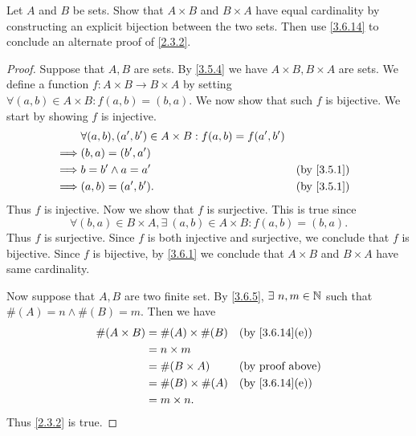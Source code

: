 \begin{ex}\label{ex:3.6.5}
  Let \(A\) and \(B\) be sets.
  Show that \(A \times B\) and \(B \times A\) have equal cardinality by constructing an explicit bijection between the two sets.
  Then use \cref{3.6.14} to conclude an alternate proof of \cref{2.3.2}.
\end{ex}

\begin{proof}
  Suppose that \(A, B\) are sets.
  By \cref{3.5.4} we have \(A \times B, B \times A\) are sets.
  We define a function \(f : A \times B \to B \times A\) by setting \(\forall (a, b) \in A \times B : f(a, b) = (b, a)\).
  We now show that such \(f\) is bijective.
  We start by showing \(f\) is injective.
  \begin{align*}
             & \forall (a, b), (a', b') \in A \times B : f(a, b) = f(a', b')                               \\
    \implies & (b, a) = (b', a')                                                                           \\
    \implies & b = b' \land a = a'                                           &  & \text{(by \cref{3.5.1})} \\
    \implies & (a, b) = (a', b').                                            &  & \text{(by \cref{3.5.1})}
  \end{align*}
  Thus \(f\) is injective.
  Now we show that \(f\) is surjective.
  This is true since
  \[
    \forall (b, a) \in B \times A, \exists\ (a, b) \in A \times B : f(a, b) = (b, a).
  \]
  Thus \(f\) is surjective.
  Since \(f\) is both injective and surjective, we conclude that \(f\) is bijective.
  Since \(f\) is bijective, by \cref{3.6.1} we conclude that \(A \times B\) and \(B \times A\) have same cardinality.

  Now suppose that \(A, B\) are two finite set.
  By \cref{3.6.5}, \(\exists\ n, m \in \N\) such that \(\#(A) = n \land \#(B) = m\).
  Then we have
  \begin{align*}
    \#(A \times B) & = \#(A) \times \#(B) &  & \text{(by \cref{3.6.14}(e))} \\
                   & = n \times m                                           \\
                   & = \#(B \times A)     &  & \text{(by proof above)}      \\
                   & = \#(B) \times \#(A) &  & \text{(by \cref{3.6.14}(e))} \\
                   & = m \times n.
  \end{align*}
  Thus \cref{2.3.2} is true.
\end{proof}

